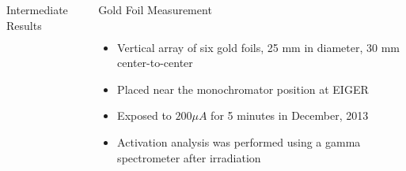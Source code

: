 \documentclass[final,t]{beamer}
\begin{document}
\begin{frame}{}
\begin{columns}[t]
\begin{column}{.3\linewidth}
\begin{block}{Intermediate Results}
\begin{columns}
      \end{columns}

      \end{block}



    \end{column}

    
    \begin{column}{.3\linewidth}

      \begin{block}{Gold Foil Measurement}
        \begin{columns}[T]
          \begin{column}{.65\linewidth}
          \begin{itemize} 
          \item Vertical array of six gold foils, \alert{25 mm} in diameter, 30 mm center-to-center
          \item Placed near the monochromator position at EIGER
          \item Exposed to \alert{$200 \mu A$} for \alert{5 minutes} in December, 2013
          \item Activation analysis was performed using a gamma spectrometer after irradiation
          \end{itemize}


\end{column}
\end{columns}
\end{block}
\end{column}
\end{columns}
\end{frame}
\end{document}
